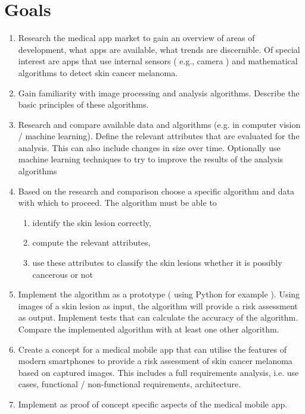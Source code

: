 \section{Goals}

\noindent
\begin{enumerate}
\item Research the medical app market to gain an overview of areas of development, what apps are available, what trends are discernible. Of special interest are apps that use internal sensors ( e.g., camera ) and mathematical algorithms to detect skin cancer melanoma.

\item Gain familiarity with image processing and analysis algorithms. Describe the basic principles of these algorithms.

\item Research and compare available data and algorithms (e.g. in computer vision / machine learning). Define the relevant attributes that are evaluated for the analysis. This can also include changes in size over time. Optionally use machine learning techniques to try to improve the results of the analysis algorithms

\item Based on the research and comparison choose a specific algorithm and data with which to proceed. The algorithm must be able to

\begin{enumerate}
\item identify the skin lesion correctly,
\item compute the relevant attributes,
\item use these attributes to classify the skin lesions whether it is possibly cancerous or not
\end{enumerate}

\item Implement the algorithm as a prototype ( using Python for example ). Using images of a skin lesion as input, the algorithm will provide a risk assessment as output. Implement tests that can calculate the accuracy of the algorithm. Compare the implemented algorithm with at least one other algorithm.


\item Create a concept for a medical mobile app that can utilise the features of modern smartphones to provide a risk assessment of skin cancer melanoma based on captured images. This includes a full requirements analysis, i.e. use cases, functional / non-functional requirements, architecture.

\item Implement as proof of concept specific aspects of the medical mobile app.

\end{enumerate}

